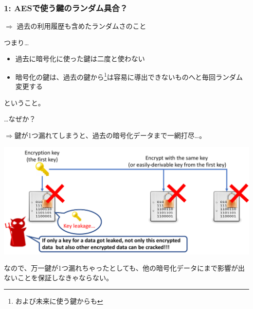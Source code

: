 \documentclass[12pt,dvipdfmx]{beamer}
\begin{document}
\begin{frame}
\frametitle{1: AESで使う鍵のランダム具合？}
$\Rightarrow$ \alert{過去の利用履歴も含めたランダムさ}のこと

\vspace{1ex}

\begin{block}{}
つまり…
\begin{itemize}
\item 過去に暗号化に使った鍵は\alert{二度と使わない}
\item 暗号化の鍵は、過去の鍵から\footnote[frame]{および未来に使う鍵からも}は容易に導出できないものへと\alert{毎回ランダム変更}する
\end{itemize}
ということ。
\end{block}

\end{frame}

\begin{frame}
…なぜか？

$\Rightarrow$鍵が1つ漏れてしまうと、過去の暗号化データまで一網打尽…。

\begin{center}
\includegraphics[width=0.9\linewidth]{Figs/pfs_bad_case.pdf}
\end{center}

\begin{block}{}
なので、万一鍵が1つ漏れちゃったとしても、他の暗号化データにまで影響が出ないことを保証しなきゃならない。
\end{block}

\end{frame}
\end{document}
